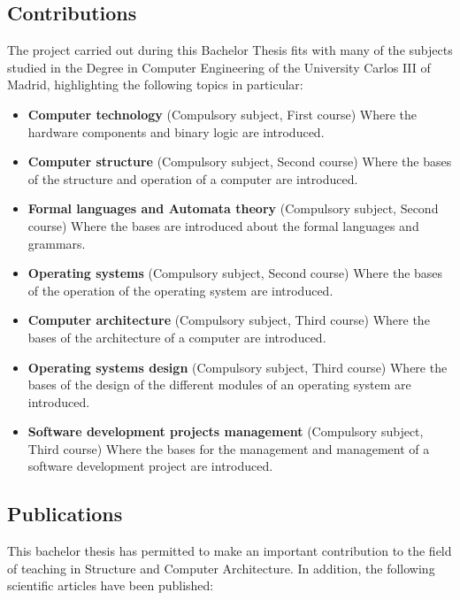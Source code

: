 \subsection*{Contributions}

The project carried out during this Bachelor Thesis fits with many of the subjects studied in the Degree in Computer Engineering of the University Carlos III of Madrid, highlighting the following topics in particular:

\begin{itemize}

\item \textbf{Computer technology} (Compulsory subject, First course) Where the hardware components and binary logic are introduced.

\item \textbf{Computer structure} (Compulsory subject, Second course) Where the bases of the structure and operation of a computer are introduced.

\item \textbf{Formal languages and Automata theory} (Compulsory subject, Second course) Where the bases are introduced about the formal languages and grammars.

\item \textbf{Operating systems} (Compulsory subject, Second course) Where the bases of the operation of the operating system are introduced.

\item \textbf{Computer architecture} (Compulsory subject, Third course) Where the bases of the architecture of a computer are introduced.

\item \textbf{Operating systems design} (Compulsory subject, Third course) Where the bases of the design of the different modules of an operating system are introduced.

\item \textbf{Software development projects management} (Compulsory subject, Third course) Where the bases for the management and management of a software development project are introduced.

\end{itemize}

\subsection*{Publications}

This bachelor thesis has permitted to make an important contribution to the field of teaching in Structure and Computer Architecture. In addition, the following scientific articles have been published:

